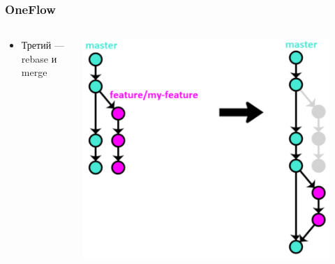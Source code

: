 \documentclass{../../slides-style}
\begin{document}
    \begin{frame}
        \frametitle{OneFlow}
        \begin{columns}
            \begin{column}{0.4\textwidth}
                \begin{itemize}
                    \item Третий --- rebase и merge
                \end{itemize}
            \end{column}
            \begin{column}{0.6\textwidth}
                \begin{center}
                    \includegraphics[width=0.9\textwidth]{oneflow3.png}
                \end{center}
            \end{column}
        \end{columns}
    \end{frame}
\end{document}
